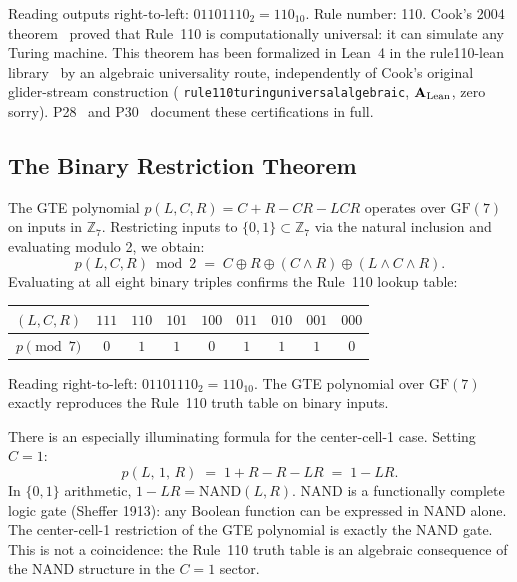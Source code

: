 \documentclass[11pt,openany]{book}
\theoremstyle{remark}
\newcommand{\lean}[1]{%
  \penalty-100
  \begingroup\def\_{\textunderscore\allowbreak}\texttt{#1}\endgroup}
\newcommand{\CatAL}{\ensuremath{\textbf{A}_{\rm Lean}}}
\begin{document}
Reading outputs right-to-left: $01101110_2 = 110_{10}$. Rule number: 110. Cook's
2004 theorem~\cite{Cook2004} proved that Rule~110 is computationally universal: it
can simulate any Turing machine. This theorem has been formalized in Lean~4 in the
rule110-lean library~\cite{rule110-lean} by an algebraic universality route,
independently of Cook's original glider-stream construction
(\lean{rule110\_turing\_universal\_algebraic}, \CatAL, zero sorry).
P28~\cite{SpivackCompUniversality} and P30~\cite{SpivackCookTheorem} document these
certifications in full.

\subsection*{The Binary Restriction Theorem}

The GTE polynomial $p(L,C,R) = C+R-CR-LCR$ operates over $\mathrm{GF}(7)$ on inputs
in $\mathbb{Z}_7$. Restricting inputs to $\{0,1\} \subset \mathbb{Z}_7$ via the
natural inclusion and evaluating modulo 2, we obtain:
\[
p(L,C,R) \bmod 2 \;=\; C \oplus R \oplus (C \wedge R) \oplus (L \wedge C \wedge R).
\]
Evaluating at all eight binary triples confirms the Rule~110 lookup table:

\begin{center}
\begin{tabular}{ccccccccc}
\toprule
$(L,C,R)$ & $111$ & $110$ & $101$ & $100$ & $011$ & $010$ & $001$ & $000$ \\
\midrule
$p \pmod 7$ & $0$ & $1$ & $1$ & $0$ & $1$ & $1$ & $1$ & $0$ \\
\bottomrule
\end{tabular}
\end{center}

Reading right-to-left: $01101110_2 = 110_{10}$. The GTE polynomial over $\mathrm{GF}(7)$
exactly reproduces the Rule~110 truth table on binary inputs.

There is an especially illuminating formula for the center-cell-1 case. Setting $C = 1$:
\begin{equation}
  p(L,\,1,\,R) \;=\; 1 + R - R - LR \;=\; 1 - LR.
  \label{eq:nand}
\end{equation}
In $\{0,1\}$ arithmetic, $1 - LR = \mathrm{NAND}(L,R)$. NAND is a functionally
complete logic gate (Sheffer 1913): any Boolean function can be expressed in NAND
alone. The center-cell-1 restriction of the GTE polynomial is exactly the NAND gate.
This is not a coincidence: the Rule~110 truth table is an algebraic consequence of
the NAND structure in the $C=1$ sector.
\end{document}
